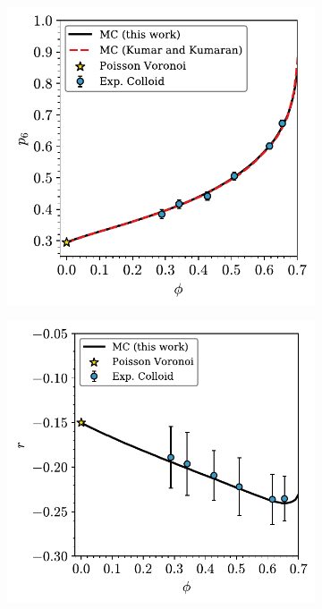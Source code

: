 
\begin{figure}[bt]
     \centering
     
      \begin{subfigure}[b]{0.45\textwidth}
         \centering
         \includegraphics[width=\textwidth]{./figures/quasi2d/mono_phi_p6.pdf}
         \caption{}
         \label{fig:mono1}
     \end{subfigure}
     \hfill
       \begin{subfigure}[b]{0.48\textwidth}
         \centering
         \includegraphics[width=\textwidth]{./figures/quasi2d/mono_phi_r.pdf}
         \caption{}
         \label{fig:mono2}
     \end{subfigure}
     \hfill
    

\end{figure}
